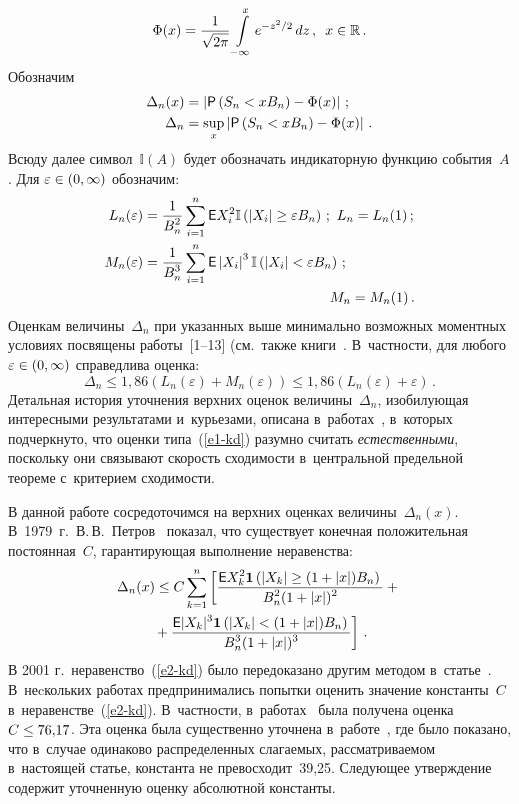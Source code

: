 \begin{multicols}{2}
\noindent
$$
\Phi(x)=\displaystyle\frac{\displaystyle 1\mathstrut}{\displaystyle \sqrt{2\pi}\mathstrut}\int\limits_{-\infty}^{x}e^{-z^2/2}\,dz\,,\enskip
x\in\mathbb{R}\,.
$$
Обозначим
\begin{align*}
\Delta_n(x)&=\left\vert{\sf P}\left(S_n<xB_n\right)-\Phi(x)\right\vert\,;\\
\Delta_n&=\sup\limits_x\left\vert{\sf P}\left(S_n<xB_n\right)-\Phi(x)\right\vert\,.
\end{align*}
Всюду далее символ~$\mathbb{I}(A)$ будет обозначать индикаторную
функцию события~$A$. Для $\varepsilon\hm\in(0,\infty)$ обозначим:
\begin{align*}
L_n(\varepsilon)&=\fr{1}{B_n^2}\sum\limits_{i=1}^n{\sf E}
X_i^2\mathbb{I}\left(\left\vert X_i\right\vert \ge \varepsilon B_n\right)\,;\
L_n=L_n(1)\,;
\\
M_n(\varepsilon)&=\fr{1}{B_n^3}\sum\limits_{i=1}^n{\sf E}
\left\vert X_i\right\vert^3\mathbb{I}\left(\left\vert X_i\right\vert < 
\varepsilon B_n\right)\,; \\
&\hspace*{47mm} M_n=M_n(1)\,.
\end{align*}
Оценкам величины~$\Delta_n$ при указанных выше минимально возможных
моментных условиях посвящены работы~[1--13] (см.\ также книги~\cite{Petrov1972, 
Petrov1987}. В~частности, для любого
$\varepsilon\hm\in(0,\infty)$ справедлива оценка:
\begin{equation}
\Delta_n\le 1,86\left(L_n(\varepsilon)+M_n(\varepsilon)\right)\le
1{,}86\left(L_n(\varepsilon)+\varepsilon\right)\,.
\label{e1-kd}
\end{equation}
Детальная история уточнения верхних оценок величины~$\Delta_n$,
изобилующая интересными результатами и~курьезами, описана 
в~работах~\cite{KorolevDorofeevaLMJ, Shevtsova}, в~которых
подчеркнуто, что оценки типа~(\ref{e1-kd}) разумно считать \textit{естественными}, 
поскольку они связывают скорость сходимости 
в~центральной предельной тео\-ре\-ме с~критерием схо\-ди\-мости.

В данной работе сосредоточимся на верхних оценках величины~$\Delta_n(x)$. 
В~1979~г.\ В.\,В.~Петров~\cite{Petrov1979} показал,
что существует конечная положительная постоянная~$C$, гарантирующая
выполнение неравенства:
\begin{multline}
\Delta_n(x)\le C\sum\limits_{k=1}^n \left[
\displaystyle\frac{\displaystyle {\sf E} X_k^2\mathbf{1}\left(|X_k|\ge
(1+|x|)B_n\right)\mathstrut}{\displaystyle B_n^2(1+|x|)^2\mathstrut}+{}\right.\\
\left.{}+\displaystyle\frac{\displaystyle {\sf E}
|X_k|^3\mathbf{1}\left(|X_k|<(1+|x|)B_n\right)\mathstrut}{\displaystyle B_n^3(1+|x|)^3\mathstrut}\right]\,.
\label{e2-kd}
\end{multline}
В 2001 г.\ неравенство~(\ref{e2-kd}) было передоказано другим методом 
в~статье~\cite{ChenShao2001}. В~неcкольких работах предпринимались
попытки оценить значение константы~$C$ в~неравенстве~(\ref{e2-kd}). 
В~част\-ности, в~работах~\cite{TN2007, NT2007} была получена
оценка $C\hm\le 76{,}17$. Эта оценка была существенно уточнена в~работе~\cite{PopovDisser}, 
где было показано, что в~случае одинаково
распределенных слагаемых, рас\-смат\-ри\-ва\-емом в~на\-сто\-ящей статье,
константа не превосходит~39,25. Следующее утверждение содержит
уточненную оценку абсолютной константы.


\end{multicols}
